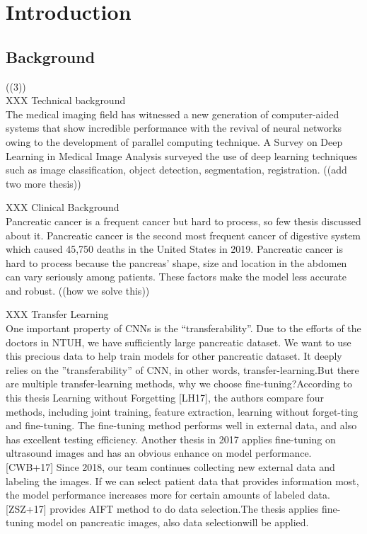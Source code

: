 \chapter{Introduction}
\section{Background}
((3))\\
XXX Technical background \\
The medical imaging field has witnessed a new generation of computer-aided systems that show incredible performance with the revival of neural networks owing to the development of parallel computing technique. A Survey on Deep Learning in Medical Image Analysis \cite{litjens2017survey} surveyed the use of deep learning techniques such as image classification, object detection, segmentation, registration. ((add two more thesis)) 

XXX Clinical Background \\
Pancreatic cancer is a frequent cancer but hard to process, so few thesis discussed about it. Pancreatic cancer is the second most frequent cancer of digestive system which caused 45,750 deaths in the United States in 2019\cite{siegel2019cancer}. Pancreatic cancer is hard to process because the pancreas’ shape, size and location in the abdomen can vary seriously among patients. These factors make the model less accurate and robust. \cite{Roth2015-mi} ((how we solve this))

XXX Transfer Learning \\
One important property of CNNs is the “transferability”.  Due to the efforts of the doctors in NTUH, we have sufficiently large pancreatic dataset.  We want to use this precious data to help train models for other pancreatic dataset.  It deeply relies on the ”transferability” of CNN, in other words, transfer-learning.But  there  are  multiple  transfer-learning  methods,  why  we  choose  fine-tuning?According to this thesis Learning without Forgetting [LH17], the authors compare four methods, including joint training, feature extraction, learning without forget-ting and fine-tuning.  The fine-tuning method performs well in external data, and also has excellent testing efficiency.  Another thesis in 2017 applies fine-tuning on ultrasound images and has an obvious enhance on model performance.  [CWB+17] Since  2018,  our  team  continues  collecting  new  external  data  and  labeling  the images.   If  we  can  select  patient  data  that  provides  information  most,  the  model performance increases more for certain amounts of labeled data.  [ZSZ+17] provides AIFT method to do data selection.The thesis applies fine-tuning model on pancreatic images,  also data selectionwill be applied.

